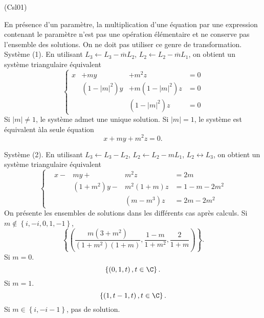 \begin{tiny}(Csl01)\end{tiny} En présence d'un paramètre, la multiplication d'une équation par une expression contenant le paramètre n'est pas une opération élémentaire et ne conserve pas l'ensemble des solutions. On ne doit pas utiliser ce genre de transformation.\newline
Système (1).\newline
En utilisant $L_3 \leftarrow L_3 - \overline{m}L_2$, $L_2 \leftarrow L_2 - \overline{m} L_1$, on obtient un système triangulaire équivalent
\[
\left\lbrace 
\begin{alignedat}{4}
 x &+ my        &+ m^2z        &= 0\\
   & (1-|m|^2)y &+ m(1-|m|^2)z &= 0\\
   &            &(1-|m|^2) z   &= 0
\end{alignedat}
\right.  
\]
Si $|m| \neq 1$, le système admet une unique solution. Si $|m|=1$, le système est équivalent àla seule équation
\[
  x + my + m^2 z = 0.
\]

Système (2).\newline
En utilisant $L_3 \leftarrow L_3 -L_2$, $L_2 \leftarrow L_2 - m L_1$, $L_2 \leftrightarrow L_3$, on obtient un système triangulaire équivalent
\[
  \left\lbrace 
  \begin{aligned}
    &x - &my +        &m^2z      &=2m\\
    &     &(1+m^2)y - &m^2(1+m)z &= 1 - m -2 m^2\\
    &     &           &(m-m^3)z  &= 2m-2m^2
  \end{aligned}
  \right.
\]
On présente les ensembles de solutions dans les différents cas après calculs.\newline
Si $m \notin \left\lbrace  i, - i, 0, 1, -1\right\rbrace$,
\[
  \left\lbrace  \left( \frac{m(3+m^2)}{(1+m^2)(1+m)}, \frac{1-m}{1+m^2}, \frac{2}{1+m}\right)\right\rbrace.
\]
Si $m = 0$.
\[
  \left\lbrace  \left( 0,1,t\right), t\in \C \right\rbrace.
\]
Si $m = 1$.
\[
  \left\lbrace  \left( 1,t-1,t\right), t\in \C \right\rbrace.
\]
Si $m \in \left\lbrace  i, - i -1\right\rbrace$, pas de solution.
